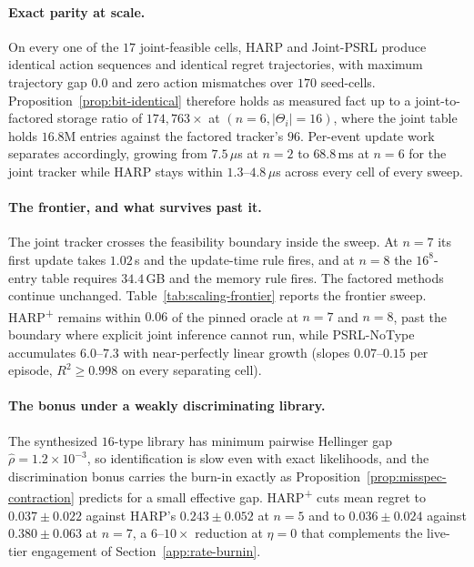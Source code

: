 \paragraph{Exact parity at scale.} On every one of the $17$ joint-feasible cells, HARP and Joint-PSRL produce identical action sequences and identical regret trajectories, with maximum trajectory gap $0.0$ and zero action mismatches over $170$ seed-cells. Proposition~\ref{prop:bit-identical} therefore holds as measured fact up to a joint-to-factored storage ratio of $174{,}763\times$ at $(n{=}6,|\Theta_i|{=}16)$, where the joint table holds $16.8$M entries against the factored tracker's $96$. Per-event update work separates accordingly, growing from $7.5\,\mu$s at $n{=}2$ to $68.8$\,ms at $n{=}6$ for the joint tracker while HARP stays within $1.3$--$4.8\,\mu$s across every cell of every sweep.

\paragraph{The frontier, and what survives past it.} The joint tracker crosses the feasibility boundary inside the sweep. At $n{=}7$ its first update takes $1.02$\,s and the update-time rule fires, and at $n{=}8$ the $16^8$-entry table requires $34.4$\,GB and the memory rule fires. The factored methods continue unchanged. Table~\ref{tab:scaling-frontier} reports the frontier sweep. HARP\textsuperscript{+} remains within $0.06$ of the pinned oracle at $n{=}7$ and $n{=}8$, past the boundary where explicit joint inference cannot run, while PSRL-NoType accumulates $6.0$--$7.3$ with near-perfectly linear growth (slopes $0.07$--$0.15$ per episode, $R^2\ge0.998$ on every separating cell).

\paragraph{The bonus under a weakly discriminating library.} The synthesized $16$-type library has minimum pairwise Hellinger gap $\hat\rho=1.2\times10^{-3}$, so identification is slow even with exact likelihoods, and the discrimination bonus carries the burn-in exactly as Proposition~\ref{prop:misspec-contraction} predicts for a small effective gap. HARP\textsuperscript{+} cuts mean regret to $0.037\pm0.022$ against HARP's $0.243\pm0.052$ at $n{=}5$ and to $0.036\pm0.024$ against $0.380\pm0.063$ at $n{=}7$, a $6$--$10\times$ reduction at $\eta{=}0$ that complements the live-tier engagement of Section~\ref{app:rate-burnin}.

